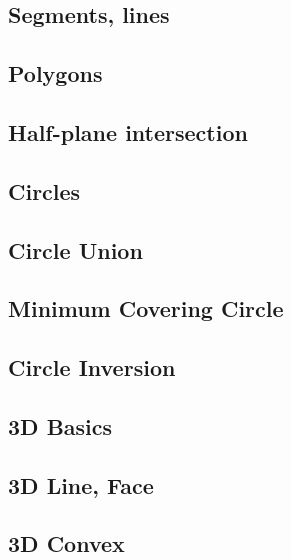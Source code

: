 \subsection{Segments, lines}
\raggedbottom
\hrulefill
\subsection{Polygons}
\raggedbottom
\hrulefill
\subsection{Half-plane intersection}
\raggedbottom
\hrulefill
\subsection{Circles}
\raggedbottom
\hrulefill
\subsection{Circle Union}
\raggedbottom
\hrulefill
\subsection{Minimum Covering Circle}
\raggedbottom
\hrulefill
\subsection{Circle Inversion}
\raggedbottom
\hrulefill
\subsection{3D Basics}
\raggedbottom
\hrulefill
\subsection{3D Line, Face}
\raggedbottom
\hrulefill
\subsection{3D Convex}
\raggedbottom
\hrulefill

